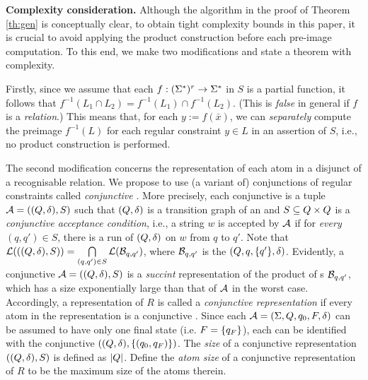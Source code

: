 %
\smallskip
\noindent
\textbf{Complexity consideration. }
Although the algorithm in the proof of Theorem \ref{th:gen} is conceptually 
clear, to obtain tight complexity bounds in this paper, it is crucial to 
avoid applying the product construction before each pre-image computation.
To this end, we make two modifications and state a theorem with complexity. 

Firstly,
since we assume that each $f: (\Sigma^*)^r \to \Sigma^*$
in $S$ is a partial function, it follows that $f^{-1}(L_1 \cap L_2) = 
f^{-1}(L_1) \cap f^{-1}(L_2)$. (This is \emph{false} in general if $f$ is a \emph{relation}.)
This means that, for each $y := f(\bar x)$, we can \emph{separately} compute 
the preimage $f^{-1}(L)$ for each regular constraint $y \in L$ in an assertion
of $S$, i.e., no product construction is performed.

The second modification concerns the representation of each atom
in a disjunct of %
a recognisable relation. We propose
to use (a variant of) conjunctions of regular constraints called
\emph{conjunctive \FA{}}. 
More precisely, each conjunctive \FA{} is a tuple $\mathcal{A} = ((Q, \delta), S)$
such that $(Q, \delta)$ is a transition graph of an \FA{} and 
$S \subseteq Q \times Q$ is a \emph{conjunctive acceptance 
condition}, i.e., a string $w$ is accepted by $\mathcal{A}$ if 
for \emph{every} $(q, q') \in S$, there is a run of $(Q, \delta)$ on
$w$ from $q$ to $q'$. 
%
Note that $\mathcal{L}(((Q, \delta), S)) = \bigcap \limits_{(q,q') \in S} \mathcal{L}(\mathcal{B}_{q,q'})$, where $\mathcal{B}_{q,q'}$ is the \FA{} $(Q, q, \{q'\}, \delta)$. Evidently, a  conjunctive \FA{} $\mathcal{A}=((Q, \delta), S)$ is a \emph{succint} representation of the product of \FA{}s $\mathcal{B}_{q,q'}$, which has a size exponentially large than that of $\mathcal{A}$ in the worst case.
%
%
Accordingly, a representation of $R$ is called a \emph{conjunctive
representation} if every atom in the representation is a conjunctive \FA{}.
Since each \FA{} $\mathcal{A} = 
(\Sigma, Q, q_0, F, \delta)$
can be assumed to have only one final state (i.e. $F = \{q_F\}$), each 
\FA{} can be identified with the conjunctive \FA{}
$((Q,\delta),\{(q_0,q_F)\})$.
The \emph{size} of a conjunctive representation $((Q, \delta), S)$ is defined as $|Q|$. Define the  \emph{atom size} of a conjunctive representation of $R$ to be the maximum size of the atoms therein.

